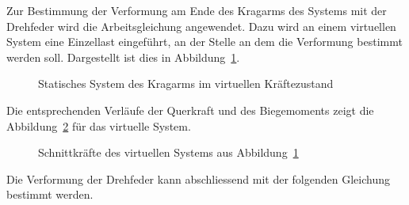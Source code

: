 \documentclass[
  10pt,
  letterpaper,
]{scrreprt}
\begin{document}
Zur Bestimmung der Verformung am Ende des Kragarms des Systems mit der
Drehfeder wird die Arbeitsgleichung angewendet. Dazu wird an einem
virtuellen System eine Einzellast eingeführt, an der Stelle an dem die
Verformung bestimmt werden soll. Dargestellt ist dies in
Abbildung~\ref{fig-kragarm-sys-virtuell}.

\begin{figure}[H]


\caption{\label{fig-kragarm-sys-virtuell}Statisches System des Kragarms
im virtuellen Kräftezustand}

\end{figure}%

Die entsprechenden Verläufe der Querkraft und des Biegemoments zeigt die
Abbildung~\ref{fig-sk-kragarm-virtuell} für das virtuelle System.

\begin{figure}[H]


\caption{\label{fig-sk-kragarm-virtuell}Schnittkräfte des virtuellen
Systems aus Abbildung~\ref{fig-kragarm-sys-virtuell}}

\end{figure}%

Die Verformung der Drehfeder kann abschliessend mit der folgenden
Gleichung bestimmt werden.
\end{document}
